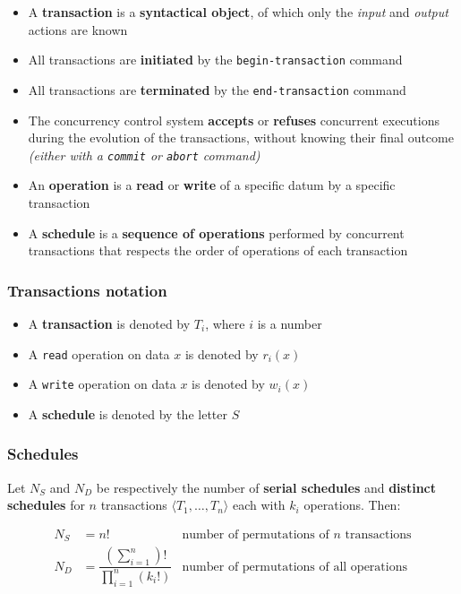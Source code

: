 \documentclass[english]{article}
\begin{document}
\begin{itemize}
  \item A \textbf{transaction} is a \textbf{syntactical object}, of which only the \textit{input} and \textit{output} actions are known
  \item All transactions are \textbf{initiated} by the \texttt{begin-transaction} command
  \item All transactions are \textbf{terminated} by the \texttt{end-transaction} command
  \item The concurrency control system \textbf{accepts} or \textbf{refuses} concurrent executions during the evolution of the transactions, without knowing their final outcome \textit{(either with a \texttt{commit} or \texttt{abort} command)}
  \item An \textbf{operation} is a \textbf{read} or \textbf{write} of a specific datum by a specific transaction
  \item A \textbf{schedule} is a \textbf{sequence of operations} performed by concurrent transactions that respects the order of operations of each transaction
\end{itemize}

\subsubsection{Transactions notation}

\begin{itemize}
  \item A \textbf{transaction} is denoted by \(T_i\), where \(i\) is a number
  \item A \texttt{read} operation on data \(x\) is denoted by \(r_i(x)\)
  \item A \texttt{write} operation on data \(x\) is denoted by \(w_i(x)\)
  \item A \textbf{schedule} is denoted by the letter \(S\)
\end{itemize}

\subsubsection{Schedules}

Let \(N_S\) and \(N_D\) be respectively the number of \textbf{serial schedules} and \textbf{distinct schedules} for \(n\) transactions \(\langle T_1, \dots, T_n \rangle\) each with \(k_i\) operations.
Then:

\begin{align*}
  N_S & = n!                                                                                        \quad & \text{number of permutations of } n \text{ transactions} \\
  N_D & = \dfrac{\displaystyle \left(\sum_{i=1}^{n}\right)!}{\displaystyle \prod_{i=1}^{n} (k_i!)}        & \text{number of permutations of all operations}
\end{align*}
\end{document}
